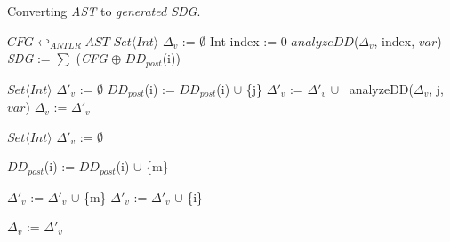 \begin{algorithm}[htb!]
%
\badianwuhao
\label{alg:ASTtoSDG}
    \caption{Converting \emph{AST} to \emph{generated SDG}.}
    \BlankLine
    $CFG \hookleftarrow_{ANTLR} AST$\;
    {
        $Set\langle Int \rangle$ $\Delta_{v}$ := $\emptyset$\;
        Int index := 0\;
        $analyzeDD$($\Delta_{v}$, index, $var$)\;
    }
    \emph{SDG} := $\sum$ (\emph{CFG} $\oplus$  $DD_{post}$(i))\;

    {
        {
            {
                $Set\langle Int \rangle$  $\Delta'_{v}$ := $\emptyset$\;
                {
                    {
                        {
                            $DD_{post}$(i) := $DD_{post}$(i) $\cup$ \{j\}\;
                        }
                    }
                    $\Delta'_{v}$ := $\Delta'_{v}$ $\cup$ \ analyzeDD($\Delta_{v}$, j, $var$)\;
                }
                $\Delta_{v}$ := $\Delta'_{v}$\;
            }
            {
                $Set\langle Int \rangle$ $\Delta'_{v}$ := $\emptyset$\;
                {
                    {
                        $DD_{post}$(i) := $DD_{post}$(i) $\cup$ \{m\}\;
                    }

                    {
                        $\Delta'_{v}$ := $\Delta'_{v}$ $\cup$ \{m\}\;
                    }
                    {
                        $\Delta'_{v}$ := $\Delta'_{v}$ $\cup$ \{i\}\;
                    }
                }
                $\Delta_{v}$ := $\Delta'_{v}$\;
            }
        }
    }
\end{algorithm}


